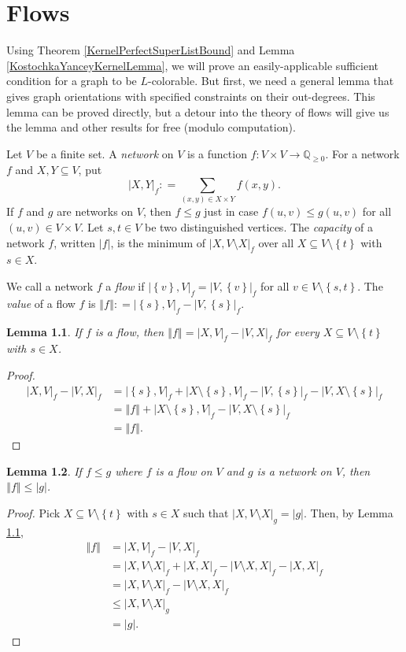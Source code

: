 \documentclass[openany]{tufte-book} %
\theoremstyle{plain}
\newtheorem{lemma}{Lemma}
\newcommand{\set}[1]{\left\{ #1 \right\}}
\newcommand{\card}[1]{\left|#1\right|}
\newcommand{\size}[1]{\left\Vert#1\right\Vert}
\newcommand{\func}[3]{#1\colon #2 \rightarrow #3}
\newcommand{\DefinedAs}{\mathrel{\mathop:}=}
\newcommand{\IQ}{\mathbb{Q}}
\begin{document}
\chapter{Flows}
Using Theorem \ref{KernelPerfectSuperListBound} and Lemma \ref{KostochkaYanceyKernelLemma}, we will prove an easily-applicable sufficient condition for a graph to be $L$-colorable.  
But first, we need a general lemma that gives graph orientations with specified constraints on their out-degrees.  This lemma can be proved directly, 
but a detour into the theory of flows will give us the lemma and other results for free (modulo computation).

Let $V$ be a finite set.  A \emph{network} on $V$ is a function $\func{f}{V\times V}{\IQ_{\ge 0}}$.  For a network $f$ and $X,Y \subseteq V$, put
\[\card{X,Y}_f \DefinedAs \sum_{(x,y) \in X\times Y} f(x,y).\]
If $f$ and $g$ are networks on $V$, then $f \le g$ just in case $f(u,v) \le g(u,v)$ for all $(u,v)\in V\times V$.
Let $s,t \in V$ be two distinguished vertices.  The \emph{capacity} of a network $f$, written $\card{f}$, is the minimum of $\card{X, V\setminus X}_f$ over all $X \subseteq V\setminus\set{t}$ with $s \in X$.

We call a network $f$ a \emph{flow} if $\card{\set{v},V}_f = \card{V,\set{v}}_f$ for all $v \in V \setminus \set{s,t}$.
The \emph{value} of a flow $f$ is $\size{f} \DefinedAs \card{\set{s},V}_f - \card{V,\set{s}}_f$.

\begin{lemma}\label{FlowValues}
If $f$ is a flow, then $\size{f} = \card{X, V}_f - \card{V, X}_f$ for every $X \subseteq V\setminus\set{t}$ with $s \in X$.
\end{lemma}
\begin{proof}
\begin{align*}
\card{X, V}_f - \card{V, X}_f &= \card{\set{s}, V}_f + \card{X\setminus\set{s}, V}_f - \card{V, \set{s}}_f - \card{V, X\setminus\set{s}}_f\\
&= \size{f} + \card{X\setminus\set{s}, V}_f - \card{V, X\setminus\set{s}}_f\\
&= \size{f}.
\end{align*}
\end{proof}

\begin{lemma}\label{FlowAtMostCapacity}
If $f \le g$ where $f$ is a flow on $V$ and $g$ is a network on $V$, then $\size{f} \le \card{g}$.
\end{lemma}
\begin{proof}
Pick $X \subseteq V\setminus\set{t}$ with $s \in X$ such that $\card{X, V\setminus X}_g = \card{g}$.  Then, by Lemma \ref{FlowValues}, 
\begin{align*}
\size{f} &= \card{X, V}_f - \card{V, X}_f \\
&= \card{X, V\setminus X}_f + \card{X,X}_f - \card{V\setminus X, X}_f - \card{X,X}_f \\
&= \card{X, V\setminus X}_f - \card{V\setminus X, X}_f\\
&\le \card{X, V\setminus X}_g \\
&= \card{g}.
\end{align*}
\end{proof}
\end{document}
